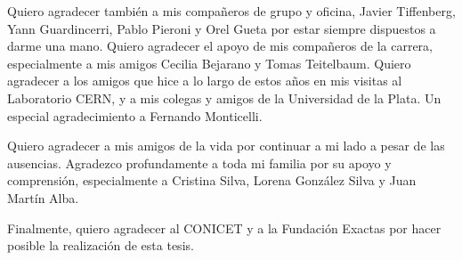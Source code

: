 \documentclass[11pt,a4paper,12pt]{report}
\begin{document}
Quiero agradecer tambi\'en a mis  compa\~neros de grupo y oficina, Javier Tiffenberg, Yann Guardincerri, Pablo Pieroni y Orel Gueta por estar siempre dispuestos a darme una mano. Quiero agradecer el apoyo de mis compa\~neros de la carrera, especialmente a mis amigos Cecilia Bejarano y Tomas Teitelbaum. Quiero agradecer a los amigos que hice a lo largo de estos a\~nos en mis visitas al Laboratorio CERN, y a mis colegas y amigos de la Universidad de la Plata. Un especial agradecimiento a Fernando Monticelli.

Quiero agradecer a mis amigos de la vida por continuar a mi lado a pesar de las ausencias. Agradezco profundamente a toda mi familia por su apoyo y comprensi\'on, especialmente a Cristina Silva, Lorena Gonz\'alez Silva y Juan Mart\'in Alba.

Finalmente, quiero agradecer al CONICET y a la Fundaci\'on Exactas por hacer posible la realizaci\'on de esta tesis.



\end{document}

